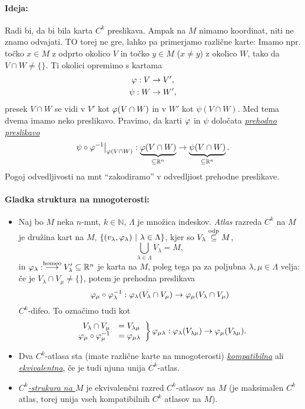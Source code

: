 \paragraph{Ideja:}
Radi bi, da bi bila karta $C^k$ preslikava. Ampak na $M$ nimamo koordinat, niti ne znamo odvajati. TO torej ne gre, lahko pa primerjamo
razli\v cne karte: Imamo npr. to\v cko $x \in M$ z odprto okolico $V$ in to\v cko $y \in M$ ($x \neq y$) z okolico $W$, tako da $V \cap
W \neq \{\}$. Ti okolici opremimo s kartama
\begin{align*}
	\varphi : V &\to V',\\
	\psi : W &\to W',
\end{align*}
presek $V \cap W$ se vidi v $V'$ kot $\varphi(V \cap W)$ in v $W'$ kot $\psi(V \cap W)$. Med tema dvema imamo neko preslikavo. Pravimo, da karti $\varphi$ in
$\psi$ dolo\v cata \underline{\emph{prehodno preslikavo}}
\[
	\psi \circ \varphi^{-1}\big|_{\varphi(V \cap W)} : \underbrace{\varphi(V \cap W)}_{\subseteq \mathbb{R}^n} \to \underbrace{\psi(V \cap W)}_{\subseteq \mathbb{R}^n}.
\]
Pogoj odvedljivosti na mnt "`zakodiramo"' v odvedljiost prehodne preslikave.

\begin{defin}
	\paragraph{Gladka struktura na mnogoterosti:}
	\begin{itemize}
		\item{Naj bo $M$ neka $n$-mnt, $k \in \mathbb{N}$, $\Lambda$ je mno\v zica indeskov. \emph{Atlas} razreda $C^k$ na $M$
			je dru\v zina kart na $M$, $\{(v_\lambda, \varphi_\lambda)\ |\ \lambda \in \Lambda\}$, kjer so $V_\lambda \stackrel{\text{odp}}{\subseteq} M$,
			\[
				\bigcup_{\lambda \in \Lambda} V_\lambda = M,
			\]
			in $\varphi_\lambda : \stackrel{\text{homeo}}{\longrightarrow} V'_\lambda \subseteq \mathbb{R}^n$ je karta na $M$, poleg tega pa za
			poljubna $\lambda, \mu \in \Lambda$ velja: \v ce je $V_\lambda \cap V_\mu \neq \{\}$, potem je prehodna preslikava
			\[
				\varphi_\mu \circ \varphi^{-1}_\lambda : \varphi_\lambda(V_\lambda \cap V_\mu) \to \varphi_\mu (V_\lambda \cap V_\mu)
			\]
			$C^k$-difeo. To ozna\v cimo tudi kot
			\[
				\left.
				\begin{array}{rl}
					V_\lambda \cap V_\mu &= V_{\lambda\mu} \\
					\varphi_\mu \circ \varphi^{-1}_\mu &=  \varphi_{\mu\lambda}
				\end{array}
				\right\} \varphi_{\mu\lambda} : \varphi_\lambda(V_{\lambda\mu}) \to \varphi_\mu (V_{\lambda\mu}).
			\]}
		\item{Dva $C^k$-atlasa sta (imate razli\v cne karte na mnogoterosti) \underline{\emph{kompatibilna}} ali \underline{\emph{ekvivalentna}},
			\v ce je tudi njuna unija $C^k$-atlas.}
		\item{\underline{\emph{$C^k$-strukura na $M$}} je ekvivalen\v cni razred $C^k$-atlasov na $M$ (je maksimalen $C^k$ atlas, torej
			unija vseh kompatibilnih $C^k$ atlasov na $M$).}
	\end{itemize}
\end{defin}

